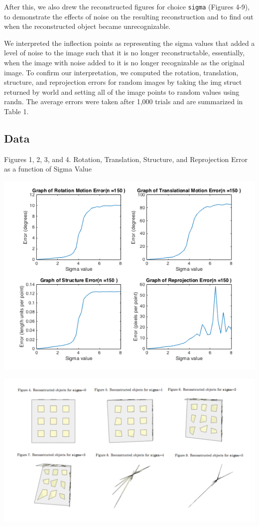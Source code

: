 \documentclass{article}
\begin{document}
After this, we also drew the reconstructed figures for choice \texttt{sigma} (Figures 4-9), to demonstrate the effects of noise on the resulting reconstruction and to find out when the reconstructed object became unrecognizable.

We interpreted the inflection points as representing the sigma values that added a level of noise to the image such that it is no longer reconstructable, essentially, when the image with noise added to it is no longer recognizable as the original image. To confirm our interpretation, we computed the rotation, translation, structure, and reprojection errors for random images by taking the img struct returned by world and setting all of the image points to random values using randn. The average errors were taken after 1,000 trials and are summarized in Table 1.


\subsection{Data}
\begin{center}
	\begin{center}Figures 1, 2, 3, and 4. Rotation, Translation, Structure, and Reprojection Error as a function of Sigma Value\end{center}
	\includegraphics[width=.7\textwidth,keepaspectratio]{experiment_1_error_plots.png}

	\includegraphics[width=\textwidth,keepaspectratio]{reconstructed_objects.png}
\end{center}
\end{document}
